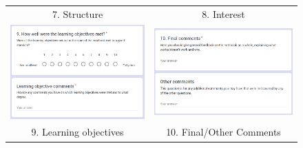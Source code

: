 \begin{appendices}
\begin{figure}[H]
\begin{tabular}{cc}
7. Structure & 8. Interest \\[6pt]
\includegraphics[width=76mm]{images/questionnaire/q9} &   \includegraphics[width=76mm]{images/questionnaire/q10} \\
9. Learning objectives & 10. Final/Other Comments \\[6pt]
\end{tabular}
\end{figure}







\end{appendices}
